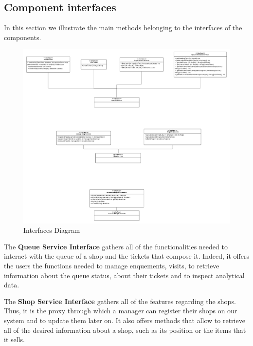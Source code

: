 \FloatBarrier

\subsection{Component interfaces}
\label{subsect:componentinterfaces}

In this section we illustrate the main methods belonging to the interfaces of the components.

\begin{figure}[h!]
    \centering
    \includegraphics[width=1\textwidth]{Images/InterfacesDiagram.png}
    \caption{\label{fig:InterfacesDiagram}{Interfaces Diagram}}
\end{figure}

\FloatBarrier

The \textbf{Queue Service Interface} gathers all of the functionalities needed to interact with the queue of a shop and the tickets that compose it.\newline
Indeed, it offers the users the functions needed to manage enquements, visits, to retrieve information about the queue status, about their tickets and to inspect analytical data.
    
The \textbf{Shop Service Interface} gathers all of the features regarding the shops. Thus, it is the proxy through which a manager can register their shops on our system and to update them later on. It also offers methods that allow to retrieve all of the desired information about a shop, such as its position or the items that it sells.

